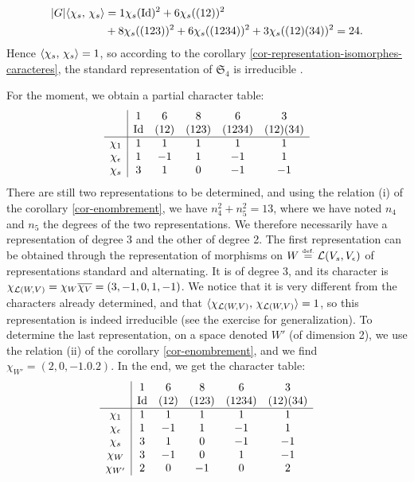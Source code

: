 \begin{rs}
\begin{align*}
|G| \langle \chi_s,\,\chi_s\rangle & = 1 \chi_s (\operatorname{Id})^2 + 6 \chi_s ((12))^2 \\
& + 8 \chi_s ((123))^2 + 6 \chi_s ((1234))^2 + 3 \chi_s ((12) (34))^2 = 24.
\end{align*}
Hence $ \langle \chi_s,\,\chi_s\rangle = 1 $, so according to the corollary \ref{cor-representation-isomorphes-caracteres}, the standard representation of $ \mathfrak{S}_4 $ is irreducible .
\end{rs} For the moment, we obtain a partial character table:
\begin{equation*}
\begin{array}{c | ccccc} & 1 & 6 & 8 & 6 & 3 \\& \operatorname{Id} & (12) & (123) & (1234) & (12) (34) \\\hline \chi_1 & 1 & 1 & 1 & 1 & 1 \\\chi_{\epsilon} & 1 & -1 & 1 & -1 & 1 \\\chi_s & 3 & 1 & 0 & -1 & -1 \end{array}
\end{equation*}
There are still two representations to be determined, and using the relation (i) of the corollary \ref{cor-enombrement}, we have $ n_4^2 + n_5^2 = 13 $, where we have noted $ n_4 $ and $ n_5 $ the degrees of the two representations. We therefore necessarily have a representation of degree 3 and the other of degree 2. The first representation can be obtained through the representation of morphisms on $ W \stackrel{\mbox{\upshape\tiny def.}}{=} \mathcal{L} (V_s, V_\epsilon) $ of representations standard and alternating. It is of degree 3, and its character is $ \chi_{\mathcal{L} (W, V)} = \chi_W \overline{\chi_V} = (3, -1,0,1, -1) $. We notice that it is very different from the characters already determined, and that $ \langle \chi_{\mathcal{L} (W, V)},\,\chi_{\mathcal{L} (W, V)}\rangle = 1 $, so this representation is indeed irreducible (see the exercise  for generalization). To determine the last representation, on a space denoted $ W'$ (of dimension 2), we use the relation (ii) of the corollary \ref{cor-enombrement}, and we find $ \chi_{W'} = (2 , 0, -1.0.2) $. In the end, we get the character table:
\begin{equation*}
\begin{array}{c | ccccc} & 1 & 6 & 8 & 6 & 3 \\& \operatorname{Id} & (12) & (123) & (1234) & (12) (34) \\\hline \chi_1 & 1 & 1 & 1 & 1 & 1 \\\chi_{\epsilon} & 1 & -1 & 1 & -1 & 1 \\\chi_s & 3 & 1 & 0 & -1 & -1 \\\chi_{W} & 3 & -1 & 0 & 1 & -1 \\\chi_{W'} & 2 & 0 & -1 & 0 & 2 \end{array}
\end{equation*}
 
